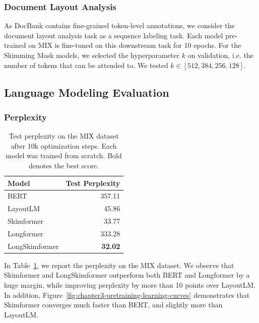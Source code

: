 \subsubsection{Document Layout Analysis}

As DocBank contains fine-grained token-level annotations, we consider the document layout analysis task as a sequence labeling task. Each model pre-trained on MIX is fine-tuned on this downstream task for 10 epochs. For the Skimming Mask models, we selected the hyperparameter $k$ on validation, i.e. the number of tokens that can be attended to. We tested $k \in [512, 384, 256, 128]$.

\subsection{Language Modeling Evaluation}

\subsubsection{Perplexity}

\begin{table}
\centering \small
\begin{tabular}{lr}
    \hline
    \textbf{Model} & \textbf{Test Perplexity}\\
    \hline
    \ac{BERT} \citep{devlin2018bert} &  357.11 \\
    LayoutLM \citep{xu2020layoutlm}    & 45.86 \\
    Skimformer                         & 33.77 \\
    \midrule
    Longformer \citep{beltagy2020longformer} & 333.28 \\
    LongSkimformer                     & \textbf{32.02} \\
    \hline
\end{tabular}
\caption{Test perplexity on the MIX dataset after 10k optimization steps. Each model was trained from scratch. Bold denotes the best score.}
\label{tab:chapter3-ppl-mix}
\end{table}

In Table~\ref{tab:chapter3-ppl-mix}, we report the perplexity on the MIX dataset. We observe that Skimformer and LongSkimformer outperform both \ac{BERT} and Longformer by a huge margin, while improving perplexity by more than 10 points over LayoutLM. In addition, Figure~\ref{fig:chapter3-pretraining-learning-curves} demonstrates that Skimformer converges much faster than \ac{BERT}, and slightly more than LayoutLM.

